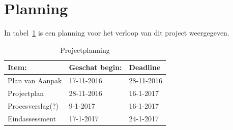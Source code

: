 \documentclass[numbers=endperiod]{scrartcl}
\begin{document}
	\section{Planning}
	In tabel~\ref{table:Planning} is een planning voor het verloop van dit project weergegeven.
	\begin{table}[h]
	\caption{Projectplanning}\label{table:Planning}
	\centering
	\begin{tabular}{| p{} | p{} | p{} |}
			\hline \rowcolor{hhs_theme_heading_2}
			Item: 				& Geschat begin:& Deadline \\ \hline
			Plan van Aanpak 	& 17-11-2016 	& 28-11-2016 \\ \hline
			Projectplan		 	& 28-11-2016	& 16-1-2017 \\ \hline
			Procesverslag(?)	& 9-1-2017		& 16-1-2017 \\ \hline
			Eindassessment		& 17-1-2017		& 24-1-2017 \\ \hline
		\end{tabular}
	\end{table}
	\newpage


	
	
\end{document}
